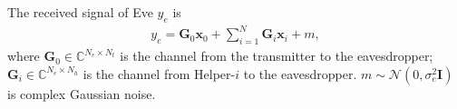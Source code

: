 \documentclass[journal]{IEEEtran}
\begin{document}
The received signal of Eve $y_e$ is
\begin{eqnarray}
y_e = \mathbf{G}_0\mathbf{x}_0 + \sum_{i = 1}^N\mathbf{G}_i\mathbf{x}_i + m,
\end{eqnarray}
where $\mathbf{G}_0 \in \mathbb{C}^{N_e \times N_t}$ is the channel from the transmitter to the eavesdropper;  $\mathbf{G}_i \in \mathbb{C}^{N_e \times N_h}$ is the channel from Helper-$i$ to the eavesdropper.  $m \sim \mathcal{N}(0,\sigma_e^2\mathbf{I})$ is complex Gaussian noise.
%
%
%
%
%
%
\end{document}
